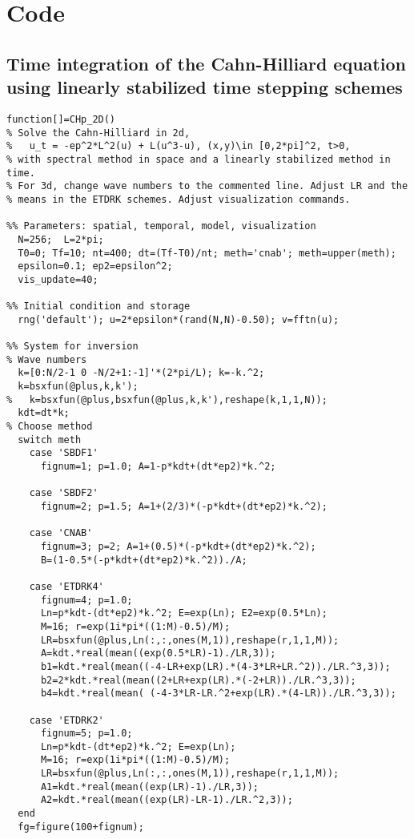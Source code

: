 \chapter{Code}
\section{Time integration of the Cahn-Hilliard equation using linearly stabilized time stepping schemes}
\label{A1 sample code}
\begin{verbatim}
function[]=CHp_2D()
% Solve the Cahn-Hilliard in 2d,
%   u_t = -ep^2*L^2(u) + L(u^3-u), (x,y)\in [0,2*pi]^2, t>0,
% with spectral method in space and a linearly stabilized method in time.
% For 3d, change wave numbers to the commented line. Adjust LR and the
% means in the ETDRK schemes. Adjust visualization commands.

%% Parameters: spatial, temporal, model, visualization
  N=256;  L=2*pi;
  T0=0; Tf=10; nt=400; dt=(Tf-T0)/nt; meth='cnab'; meth=upper(meth);
  epsilon=0.1; ep2=epsilon^2; 
  vis_update=40;

%% Initial condition and storage
  rng('default'); u=2*epsilon*(rand(N,N)-0.50); v=fftn(u);
  
%% System for inversion
% Wave numbers
  k=[0:N/2-1 0 -N/2+1:-1]'*(2*pi/L); k=-k.^2; 
  k=bsxfun(@plus,k,k'); 
%   k=bsxfun(@plus,bsxfun(@plus,k,k'),reshape(k,1,1,N));
  kdt=dt*k;
% Choose method
  switch meth
    case 'SBDF1'
      fignum=1; p=1.0; A=1-p*kdt+(dt*ep2)*k.^2;
      
    case 'SBDF2'
      fignum=2; p=1.5; A=1+(2/3)*(-p*kdt+(dt*ep2)*k.^2);
      
    case 'CNAB'
      fignum=3; p=2; A=1+(0.5)*(-p*kdt+(dt*ep2)*k.^2); 
      B=(1-0.5*(-p*kdt+(dt*ep2)*k.^2))./A;
      
    case 'ETDRK4'
      fignum=4; p=1.0; 
      Ln=p*kdt-(dt*ep2)*k.^2; E=exp(Ln); E2=exp(0.5*Ln);
      M=16; r=exp(1i*pi*((1:M)-0.5)/M);
      LR=bsxfun(@plus,Ln(:,:,ones(M,1)),reshape(r,1,1,M));
      A=kdt.*real(mean((exp(0.5*LR)-1)./LR,3));
      b1=kdt.*real(mean((-4-LR+exp(LR).*(4-3*LR+LR.^2))./LR.^3,3));
      b2=2*kdt.*real(mean((2+LR+exp(LR).*(-2+LR))./LR.^3,3));
      b4=kdt.*real(mean( (-4-3*LR-LR.^2+exp(LR).*(4-LR))./LR.^3,3));
  
    case 'ETDRK2'
      fignum=5; p=1.0;
      Ln=p*kdt-(dt*ep2)*k.^2; E=exp(Ln); 
      M=16; r=exp(1i*pi*((1:M)-0.5)/M);
      LR=bsxfun(@plus,Ln(:,:,ones(M,1)),reshape(r,1,1,M));
      A1=kdt.*real(mean((exp(LR)-1)./LR,3));
      A2=kdt.*real(mean((exp(LR)-LR-1)./LR.^2,3)); 
  end
  fg=figure(100+fignum);
  

\end{verbatim}
